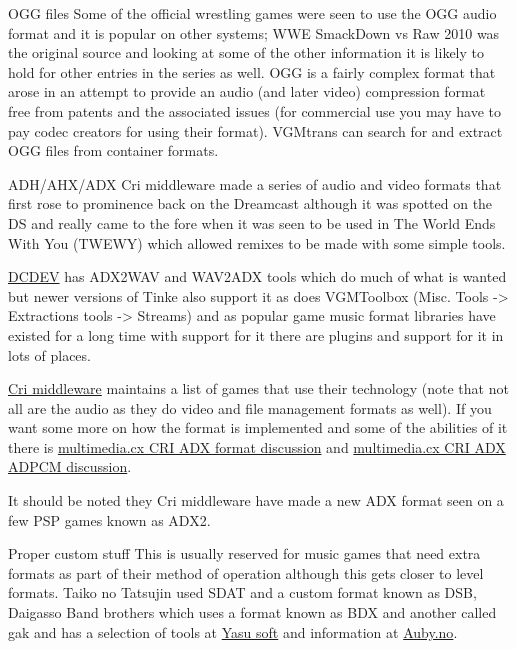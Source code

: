 \documentclass[
]{book}
\begin{document}
OGG files Some of the official wrestling games were seen to use the OGG audio format and it is popular on other systems; WWE SmackDown vs Raw 2010 was the original source and looking at some of the other information it is likely to hold for other entries in the series as well. OGG is a fairly complex format that arose in an attempt to provide an audio (and later video) compression format free from patents and the associated issues (for commercial use you may have to pay codec creators for using their format). VGMtrans can search for and extract OGG files from container formats.

ADH/AHX/ADX Cri middleware made a series of audio and video formats that first rose to prominence back on the Dreamcast although it was spotted on the DS and really came to the fore when it was seen to be used in The World Ends With You (TWEWY) which allowed remixes to be made with some simple tools.

\href{http://www.geocities.co.jp/Playtown/2004/dcdev/dcdev.html}{DCDEV} has ADX2WAV and WAV2ADX tools which do much of what is wanted but newer versions of Tinke also support it as does VGMToolbox (Misc. Tools -\textgreater{} Extractions tools -\textgreater{} Streams) and as popular game music format libraries have existed for a long time with support for it there are plugins and support for it in lots of places.

\href{http://www.cri-mw.com/product/adoption/platform/ds.html}{Cri middleware} maintains a list of games that use their technology (note that not all are the audio as they do video and file management formats as well). If you want some more on how the format is implemented and some of the abilities of it there is \href{http://wiki.multimedia.cx/index.php?title=CRI_ADX_file}{multimedia.cx CRI ADX format discussion} and \href{http://wiki.multimedia.cx/index.php?title=CRI_ADX_ADPCM}{multimedia.cx CRI ADX ADPCM discussion}.

It should be noted they Cri middleware have made a new ADX format seen on a few PSP games known as ADX2.

Proper custom stuff This is usually reserved for music games that need extra formats as part of their method of operation although this gets closer to level formats. Taiko no Tatsujin used SDAT and a custom format known as DSB, Daigasso Band brothers which uses a format known as BDX and another called gak and has a selection of tools at \href{http://home.usay.jp/pc/etc/nds/}{Yasu soft} and information at \href{http://www.auby.no/wiki/index.php?title=Band_Brothers_DX}{Auby.no}.
\end{document}

